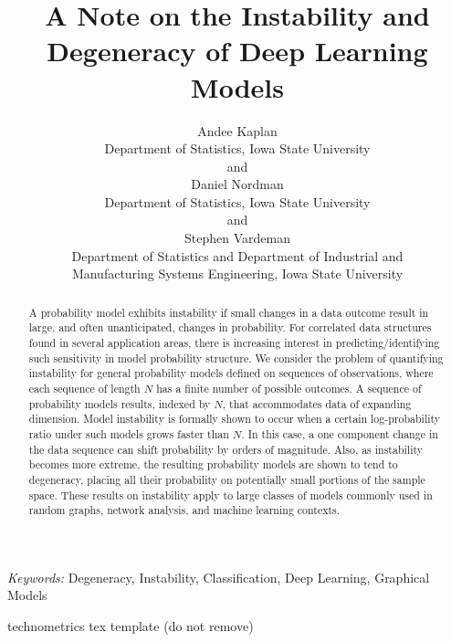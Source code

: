 \documentclass[]{article}
\theoremstyle{definition}
\begin{document}
\def\spacingset#1{\renewcommand{\baselinestretch}%
{#1}\small\normalsize} \spacingset{1}

\title{\bf A Note on the Instability and Degeneracy of Deep Learning Models}
\author{Andee Kaplan \\ Department of Statistics, Iowa State University \\  and \\ Daniel Nordman \\ Department of Statistics, Iowa State University \\  and \\ Stephen Vardeman \\ Department of Statistics and Department of Industrial and\\
Manufacturing Systems Engineering, Iowa State University \\ }

\maketitle
\begin{abstract}
A probability model exhibits instability if small changes in a data
outcome result in large, and often unanticipated, changes in
probability. For correlated data structures found in several application
areas, there is increasing interest in predicting/identifying such
sensitivity in model probability structure. We consider the problem of
quantifying instability for general probability models defined on
sequences of observations, where each sequence of length \(N\) has a
finite number of possible outcomes. A sequence of probability models
results, indexed by \(N\), that accommodates data of expanding
dimension. Model instability is formally shown to occur when a certain
log-probability ratio under such models grows faster than \(N\). In this
case, a one component change in the data sequence can shift probability
by orders of magnitude. Also, as instability becomes more extreme, the
resulting probability models are shown to tend to degeneracy, placing
all their probability on potentially small portions of the sample space.
These results on instability apply to large classes of models commonly
used in random graphs, network analysis, and machine learning contexts.
\end{abstract}
\noindent%
{\it Keywords:}  Degeneracy, Instability, Classification, Deep Learning, Graphical Models
\vfill

\hfill {\tiny technometrics tex template (do not remove)}
\newpage
\spacingset{1.45} %
\end{document}
